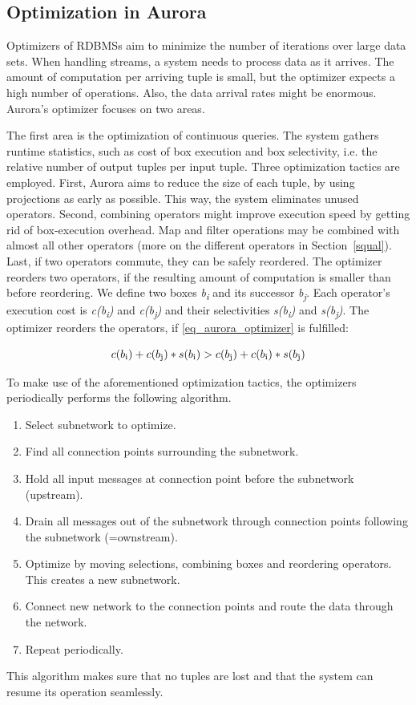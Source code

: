 \subsection{Optimization in Aurora}\label{auroraOptimization}
Optimizers of RDBMSs aim to minimize the number of iterations over large data sets. When handling streams, a system needs to process data as it arrives. The amount of computation per arriving tuple is small, but the optimizer expects a high number of operations. Also, the data arrival rates might be enormous. Aurora's optimizer focuses on two areas. 

The first area is the optimization of continuous queries. The system gathers runtime statistics, such as cost of box execution and box selectivity, i.e. the relative number of output tuples per input tuple. Three optimization tactics are employed. First, Aurora aims to reduce the size of each tuple, by using projections as early as possible. This way, the system eliminates unused operators. Second, combining operators might improve execution speed by getting rid of box-execution overhead. Map and filter operations may be combined with almost all other operators (more on the different operators in Section~\ref{squal}). Last, if two operators commute, they can be safely reordered. The optimizer reorders two operators, if the resulting amount of computation is smaller than before reordering. We define two boxes \textit{b\textsubscript{i}} and its successor \textit{b\textsubscript{j}}. Each operator's execution cost is \textit{c(b\textsubscript{i})} and \textit{c(b\textsubscript{j})} and their selectivities \textit{s(b\textsubscript{i})} and \textit{s(b\textsubscript{j})}. The optimizer reorders the operators, if \eqref{eq_aurora_optimizer} is fulfilled:

\begin{equation}
c(b\textsubscript{i})+c(b\textsubscript{j})*s(b\textsubscript{i})>c(b\textsubscript{j})+c(b\textsubscript{i})*s(b\textsubscript{j})\label{eq_aurora_optimizer}
\end{equation}

To make use of the aforementioned optimization tactics, the optimizers periodically performs the following algorithm.

\begin{enumerate}\label{enum_optimization_algorithm}
\item Select subnetwork to optimize.
\item Find all connection points surrounding the subnetwork.
\item Hold all input messages at connection point before the subnetwork (upstream).
\item Drain all messages out of the subnetwork through connection points following the subnetwork (=ownstream).
\item Optimize by moving selections, combining boxes and reordering operators. This creates a new subnetwork.
\item Connect new network to the connection points and route the data through the network. 
\item Repeat periodically.
\end{enumerate}
This algorithm makes sure that no tuples are lost and that the system can resume its operation seamlessly.

